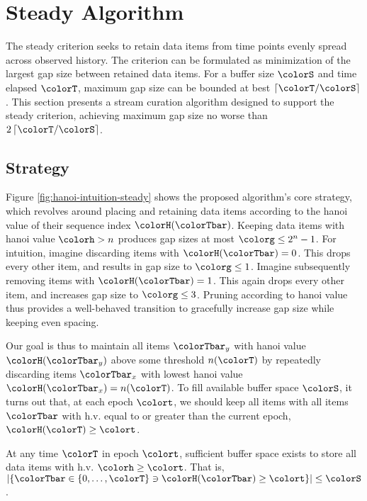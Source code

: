 \section{Steady Algorithm} \label{sec:steady}

The steady criterion seeks to retain data items from time points evenly spread across observed history.
The criterion can be formulated as minimization of the largest gap size between retained data items.
For a buffer size $\colorS$ and time elapsed $\colorT$, maximum gap size can be bounded at best $\left\lceil \colorT / \colorS \right\rceil$.
This section presents a stream curation algorithm designed to support the steady criterion, achieving maximum gap size no worse than $2\left\lceil \colorT / \colorS \right\rceil$.

\subsection{Strategy}

Figure \ref{fig:hanoi-intuition-steady} shows the proposed algorithm's core strategy, which revolves around placing and retaining data items according to the hanoi value of their sequence index $\colorH(\colorTbar)$.
Keeping data items with hanoi value $\colorh > n$ produces gap sizes at most $\colorg \leq 2^n - 1$.
For intuition, imagine discarding items with $\colorH(\colorTbar) = 0$.
This drops every other item, and results in gap size to $\colorg \leq 1$.
Imagine subsequently removing items with $\colorH(\colorTbar) = 1$.
This again drops every other item, and increases gap size to $\colorg \leq 3$.
Pruning according to hanoi value thus provides a well-behaved transition to gracefully increase gap size while keeping even spacing.

Our goal is thus to maintain all items $\colorTbar_y$ with hanoi value $\colorH(\colorTbar_y)$ above some threshold $n(\colorT)$ by repeatedly discarding items $\colorTbar_x$ with lowest hanoi value $\colorH(\colorTbar_x) = n(\colorT)$.
To fill available buffer space $\colorS$, it turns out that, at each epoch $\colort$, we should keep all items with all items $\colorTbar$ with h.v. equal to or greater than the current epoch, $\colorH(\colorT) \geq \colort$.

\begin{lemma}
At any time $\colorT$ in epoch $\colort$, sufficient buffer space exists to store all data items with h.v. $\colorh \geq \colort$.
That is, $\left| \{\colorTbar \in \{0, \ldots, \colorT \} \ni \colorH(\colorTbar) \geq \colort \} \right| \leq \colorS$.
\end{lemma}

